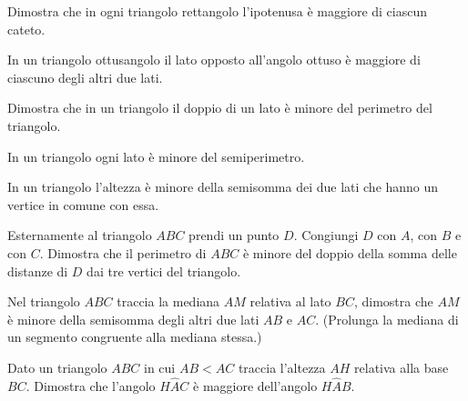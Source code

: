 \begin{multicols}{2}

\begin{esercizio}
\label{ese:3.84}
Dimostra che in ogni triangolo rettangolo l'ipotenusa è maggiore di 
ciascun cateto.
\end{esercizio}

\begin{esercizio}
\label{ese:3.86}
In un triangolo ottusangolo il lato opposto all'angolo ottuso è 
maggiore di ciascuno degli altri due lati.
\end{esercizio}

\begin{esercizio}
\label{ese:3.87}
Dimostra che in un triangolo il doppio di un lato è minore del 
perimetro del triangolo. 
\end{esercizio}

\begin{esercizio}
\label{ese:3.92}
In un triangolo ogni lato è minore del semiperimetro.
\end{esercizio}

\begin{esercizio}
\label{ese:3.93}
In un triangolo l'altezza è minore della semisomma dei due lati che 
hanno un vertice in comune con essa.
\end{esercizio}

\begin{esercizio}
\label{ese:3.98}
Esternamente al triangolo \(ABC\) prendi un punto \(D\). Congiungi \(D\) 
con \(A\), con \(B\) e con \(C\). Dimostra che il perimetro di \(ABC\) è 
minore del doppio della somma delle distanze di \(D\) dai tre vertici 
del triangolo.
\end{esercizio}

\begin{esercizio}
\label{ese:3.99}
Nel triangolo \(ABC\) traccia la mediana \(AM\) relativa al lato \(BC\), 
dimostra che \(AM\) è minore della semisomma degli altri due lati \(AB\) 
e \(AC\). (Prolunga la mediana di un segmento congruente alla mediana 
stessa.)
\end{esercizio}

\begin{esercizio}
\label{ese:3.102}
Dato un triangolo \(ABC\) in cui \(AB<AC\) traccia l'altezza \(AH\) 
relativa alla base \(BC\). Dimostra che l'angolo \(H\widehat{A}C\) è 
maggiore dell'angolo \(H\widehat{A}B\).
\end{esercizio}

% 

\end{multicols}

